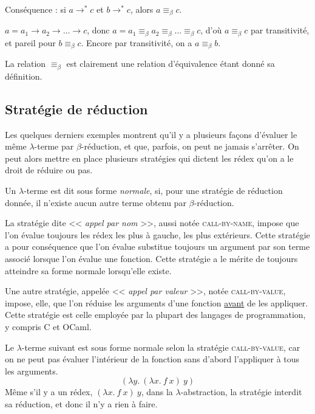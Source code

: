 \documentclass[11pt]{article}
\begin{document}
\begin{theorem}
    Conséquence : si $a \longrightarrow^* c$ et $b \longrightarrow^*c$, alors $a \equiv_\beta c$.
    \begin{preuve}
        $a = a_1 \longrightarrow a_2 \longrightarrow \dots \longrightarrow c$, donc $a = a_1 \equiv_\beta a_2 \equiv_\beta \dots \equiv_\beta c$, d'où $a \equiv_\beta c$ par transitivité, et pareil pour $b \equiv_\beta c$. Encore par transitivité, on a $a \equiv_\beta b$.
    \end{preuve}
\end{theorem}

La relation $\equiv_\beta$ est clairement une relation d'équivalence étant donné sa définition.

\subsection{Stratégie de réduction}

Les quelques derniers exemples montrent qu'il y a plusieurs façons d'évaluer le même $\lambda$-terme par $\beta$-réduction, et que, parfois, on peut ne jamais s'arrêter.
On peut alors mettre en place plusieurs stratégies qui dictent les rédex qu'on a le droit de réduire ou pas. 

\begin{definition}
    Un $\lambda$-terme est dit sous forme \textit{normale}, si, pour une stratégie de réduction donnée, il n'existe aucun autre terme obtenu par $\beta$-réduction.
\end{definition}

La stratégie dite << \textit{appel par nom} >>, aussi notée {\scshape{call-by-name}}, impose que l'on évalue toujours les rédex les plus à gauche, les plus extérieurs. Cette stratégie a pour conséquence que l'on évalue substitue toujours un argument par son terme associé lorsque l'on évalue une fonction. Cette stratégie a le mérite de toujours atteindre sa forme normale lorsqu'elle existe.

Une autre stratégie, appelée << \textit{appel par valeur} >>, notée {\scshape{call-by-value}}, impose, elle, que l'on réduise les arguments d'une fonction \underline{avant} de les appliquer. Cette stratégie est celle employée par la plupart des langages de programmation, y compris C et OCaml.

\begin{example}
    Le $\lambda$-terme suivant est sous forme normale selon la stratégie {\scshape{call-by-value}}, car on ne peut pas évaluer l'intérieur de la fonction sans d'abord l'appliquer à tous les arguments.
    $$(\lambda y.~(\lambda x.~f~x)~y)$$
    Même s'il y a un rédex, $(\lambda x.~f~x)~y$, dans la $\lambda$-abstraction, la stratégie interdit sa réduction, et donc il n'y a rien à faire.
\end{example}
\end{document}

